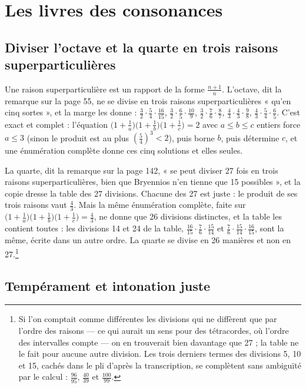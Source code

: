 \documentclass[11pt,a4paper]{article}
\begin{document}
\section*{Les livres des consonances}

\subsection*{Diviser l'octave et la quarte en trois raisons superparticulières}

Une raison superparticulière est un rapport de la forme $\frac{n+1}{n}$.
L'octave, dit la remarque sur la page 55, ne se divise en trois raisons
superparticulières « qu'en cinq sortes », et la marge les donne :
$\frac32\cdot\frac54\cdot\frac{16}{15}$, $\frac32\cdot\frac65\cdot\frac{10}{9}$,
$\frac32\cdot\frac76\cdot\frac87$, $\frac43\cdot\frac43\cdot\frac98$,
$\frac43\cdot\frac54\cdot\frac65$. C'est exact et complet : l'équation
$\bigl(1+\frac1a\bigr)\bigl(1+\frac1b\bigr)\bigl(1+\frac1c\bigr) = 2$ avec
$a \le b \le c$ entiers force $a \le 3$ (sinon le produit est au plus
$(\frac54)^3 < 2$), puis borne $b$, puis détermine $c$, et une énumération
complète donne ces cinq solutions et elles seules.

La quarte, dit la remarque sur la page 142, « se peut diviser 27 fois en trois
raisons superparticulières, bien que Bryennios n'en tienne que 15 possibles »,
et la copie dresse la table des 27 divisions. Chacune des 27 est juste : le
produit de ses trois raisons vaut $\frac43$. Mais la même énumération complète,
faite sur $\bigl(1+\frac1a\bigr)\bigl(1+\frac1b\bigr)\bigl(1+\frac1c\bigr) =
\frac43$, ne donne que 26 divisions distinctes, et la table les contient toutes :
les divisions 14 et 24 de la table,
$\frac{16}{15}\cdot\frac76\cdot\frac{15}{14}$ et
$\frac76\cdot\frac{15}{14}\cdot\frac{16}{15}$, sont la même, écrite dans un autre
ordre. La quarte se divise en 26 manières et non en 27.\footnote{Si l'on comptait
comme différentes les divisions qui ne diffèrent que par l'ordre des raisons —
ce qui aurait un sens pour des tétracordes, où l'ordre des intervalles compte —
on en trouverait bien davantage que 27 ; la table ne le fait pour aucune autre
division. Les trois derniers termes des divisions 5, 10 et 15, cachés dans le pli
d'après la transcription, se complètent sans ambiguïté par le calcul :
$\frac{96}{95}$, $\frac{40}{39}$ et $\frac{100}{99}$.}

\subsection*{Tempérament et intonation juste}
\end{document}
